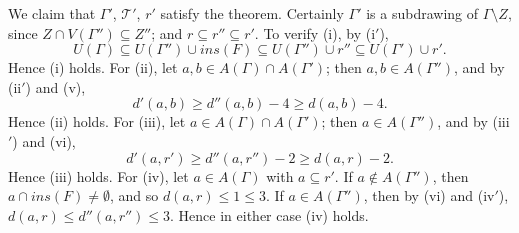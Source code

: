 We claim that $\Gamma'$, $\mathscr{T}'$, $r'$ satisfy the theorem. Certainly $\Gamma'$ is a subdrawing of $\Gamma \setminus Z$, since $Z \cap V(\Gamma'') \subseteq Z''$; and $r \subseteq r'' \subseteq r'$. To verify (i), by (i$'$),
\begin{equation*}
U(\Gamma) \subseteq U(\Gamma'') \cup ins(F) \subseteq U(\Gamma'') \cup r'' \subseteq U(\Gamma') \cup r'.
\end{equation*}
Hence (i) holds. For (ii), let $a, b \in A(\Gamma) \cap A(\Gamma')$; then $a, b \in A(\Gamma'')$, and by (ii$'$) and (v),
\begin{equation*}
d'(a, b) \ge d''(a, b) - 4 \ge d(a, b) - 4.
\end{equation*}
Hence (ii) holds. For (iii), let $a \in A(\Gamma) \cap A(\Gamma')$; then $a \in A(\Gamma'')$, and by (iii$'$) and (vi),
\begin{equation*}
d'(a, r') \ge d''(a, r'') - 2 \ge d(a, r) - 2.
\end{equation*}
Hence (iii) holds. For (iv), let $a \in A(\Gamma)$ with $a \subseteq r'$. If $a \notin A(\Gamma'')$, then $a \cap ins(F) \ne \emptyset$, and so $d(a, r) \le 1 \le 3$. If $a \in A(\Gamma'')$, then by (vi) and (iv$'$), $d(a, r) \le d''(a, r'') \le 3$. Hence in either case (iv) holds.
